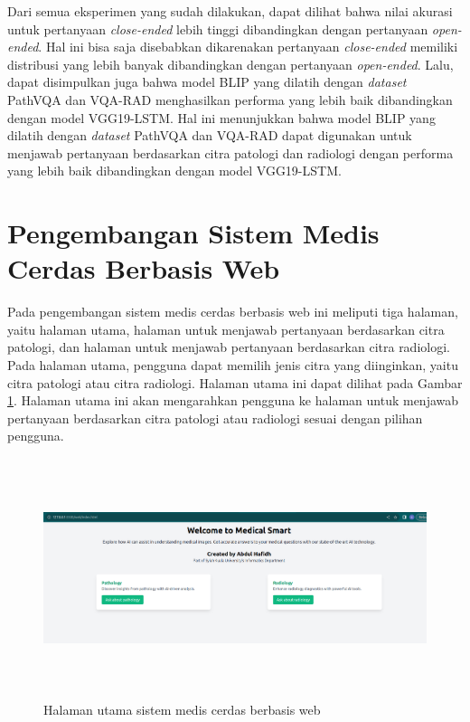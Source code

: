 \par Dari semua eksperimen yang sudah dilakukan, dapat dilihat bahwa nilai akurasi untuk pertanyaan \textit{close-ended} lebih tinggi dibandingkan dengan pertanyaan \textit{open-ended}. Hal ini bisa saja disebabkan dikarenakan pertanyaan \textit{close-ended} memiliki distribusi yang lebih banyak dibandingkan dengan pertanyaan \textit{open-ended}. Lalu, dapat disimpulkan juga bahwa model BLIP yang dilatih dengan \textit{dataset} PathVQA dan VQA-RAD menghasilkan performa yang lebih baik dibandingkan dengan model VGG19-LSTM. Hal ini menunjukkan bahwa model BLIP yang dilatih dengan \textit{dataset} PathVQA dan VQA-RAD dapat digunakan untuk menjawab pertanyaan berdasarkan citra patologi dan radiologi dengan performa yang lebih baik dibandingkan dengan model VGG19-LSTM.

\section{Pengembangan Sistem Medis Cerdas Berbasis Web}

\par Pada pengembangan sistem medis cerdas berbasis web ini meliputi tiga halaman, yaitu halaman utama, halaman untuk menjawab pertanyaan berdasarkan citra patologi, dan halaman untuk menjawab pertanyaan berdasarkan citra radiologi. Pada halaman utama, pengguna dapat memilih jenis citra yang diinginkan, yaitu citra patologi atau citra radiologi. Halaman utama ini dapat dilihat pada Gambar \ref{fig:halaman-utama}. Halaman utama ini akan mengarahkan pengguna ke halaman untuk menjawab pertanyaan berdasarkan citra patologi atau radiologi sesuai dengan pilihan pengguna.

\begin{figure}[H]
    \centering
    \label{fig:halaman-utama}
    \includegraphics[width=\textwidth, height = 7cm]{image/bab4/halaman_utama.png}
    \caption{Halaman utama sistem medis cerdas berbasis web}
    \label{fig:halaman-utama}
\end{figure}

